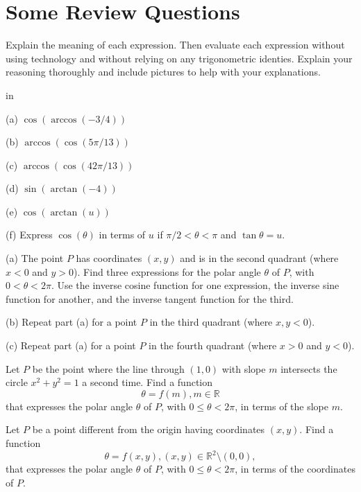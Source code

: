 \documentclass{ximera}
\newcommand{\pskip}{\vskip 0.1 in}
\begin{document}
\section{Some Review Questions}

\begin{question}   \label{Q17:InverseTrig}
Explain the meaning of each expression. Then evaluate each expression without using technology and without relying on any trigonometric identies. Explain your reasoning thoroughly and include pictures to help with your explanations.

\pskip

(a) $\cos (\arccos(-3/4))$ 

(b) $\arccos(\cos (5\pi/13))$

(c) $\arccos(\cos (42\pi/13))$

(d) $\sin(\arctan (-4))$

(e) $\cos(\arctan (u))$

(f) Express $\cos (\theta)$ in terms of $u$  if $\pi/2 < \theta < \pi$ and $\tan \theta=u$.

\end{question} 


\begin{question} \label{Q18:InverseTrig}
(a) The point $P$ has coordinates $(x,y)$ and is in the second quadrant (where $x<0$ and $y>0$). Find three expressions for the polar angle $\theta$ of $P$, with $0 < \theta < 2\pi$. Use the inverse cosine function for one expression, the inverse sine function for another, and the inverse tangent function for the third. 

(b) Repeat part (a) for a point $P$ in the third quadrant (where $x,y<0$).

(c) Repeat part (a) for a point $P$ in the fourth quadrant (where $x>0$ and $y<0$).
\end{question}



\begin{question} \label{Q19:InverseTrig}
Let $P$ be the point where the line through $(1,0)$ with slope $m$ intersects the circle $x^2+y^2=1$ a second time. Find a function 
\[
      \theta = f(m) , m \in \mathbb{R}
\] 
that expresses the polar angle $\theta$ of $P$, with $0 \leq  \theta < 2\pi$, in terms of the slope $m$. 
\end{question}

\begin{question} \label{Q20:InverseTrig}
Let $P$ be a point different from the origin having coordinates $(x,y)$. Find a function 
\[
      \theta = f(x,y) , (x,y) \in \mathbb{R}^2 \setminus {(0,0)} ,
\] 
that expresses the polar angle $\theta$ of $P$, with $0 \leq  \theta < 2\pi$, in terms of the coordinates of $P$.

\end{question}
\end{document}
